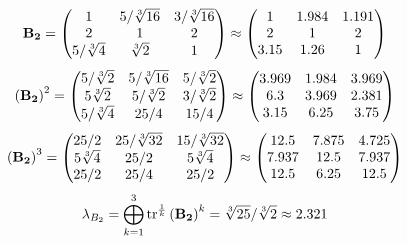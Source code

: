 \documentclass[10pt,a4paper]{article}
\begin{document}
	\[
		\bold{B_2} = 
		\begin{pmatrix}
			{1}{} & {{5}} / {\sqrt[3]{16}} & {{3}} / {\sqrt[3]{16}} \\
			{{2}}{} & {1}{} & {{2}}{} \\
			{{5}} / {\sqrt[3]{4}} & {\sqrt[3]{2}}{} & {1}{} \\
		\end{pmatrix}
		\approx
		\begin{pmatrix}
			1        & 1.984    & 1.191    \\
			2        & 1        & 2        \\
			3.15     & 1.26     & 1        \\
		\end{pmatrix}
	\]
	\[
		\left(\bold{B_2}\right)^{2} = 
		\begin{pmatrix}
			{{5}} / {\sqrt[3]{2}} & {{5}} / {\sqrt[3]{16}} & {{5}} / {\sqrt[3]{2}} \\
			{{5}\sqrt[3]{2}}{} & {{5}} / {\sqrt[3]{2}} & {{3}} / {\sqrt[3]{2}} \\
			{{5}} / {\sqrt[3]{4}} & {{25}} / {{4}} & {{15}} / {{4}} \\
		\end{pmatrix}
		\approx
		\begin{pmatrix}
			3.969    & 1.984    & 3.969    \\
			6.3      & 3.969    & 2.381    \\
			3.15     & 6.25     & 3.75     \\
		\end{pmatrix}
	\]
	\[
		\left(\bold{B_2}\right)^{3} = 
		\begin{pmatrix}
			{{25}} / {{2}} & {{25}} / {\sqrt[3]{32}} & {{15}} / {\sqrt[3]{32}} \\
			{{5}\sqrt[3]{4}}{} & {{25}} / {{2}} & {{5}\sqrt[3]{4}}{} \\
			{{25}} / {{2}} & {{25}} / {{4}} & {{25}} / {{2}} \\
		\end{pmatrix}
		\approx
		\begin{pmatrix}
			12.5     & 7.875    & 4.725    \\
			7.937    & 12.5     & 7.937    \\
			12.5     & 6.25     & 12.5     \\
		\end{pmatrix}
	\]
	\[
		\lambda_{B_2} =  \bigoplus ^{3} _{k = 1} \operatorname{tr} ^{\frac 1 k} \left( \bold{B_2} \right)^k = {\sqrt[3]{25}} / {\sqrt[3]{2}}\approx 2.321
	\]
\end{document}

